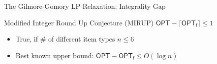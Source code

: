 \documentclass[xcolor=table]{beamer} %
\theoremstyle{definition}
\theoremstyle{plain}
\theoremstyle{remark}
\renewcommand{\b}[1]{\textcolor{dblue}{#1}}
\begin{document}
\begin{frame}{The Gilmore-Gomory LP Relaxation: Integrality Gap}
        
                
    
    {\begin{alertblock}{Modified Integer Round Up Conjecture (MIRUP)}
        $\mathsf{OPT} - \lceil \mathsf{OPT_f} \rceil \leq 1$
    \end{alertblock}}
    
    \begin{itemize}
        \item  {\color{green}True}, if $\#$ of different item types $n \leq  6$
        
        \item  Best known upper bound: $\mathsf{OPT} - \mathsf{OPT_f} \leq O(\log n)$
        
        \onslide<2->{\item  \textbf{\b{Additive Integrality Gap}} $= \mathsf{OPT} - \mathsf{OPT_f}$}
        
    \end{itemize}    
    
    
\end{frame}


        
\end{document}
